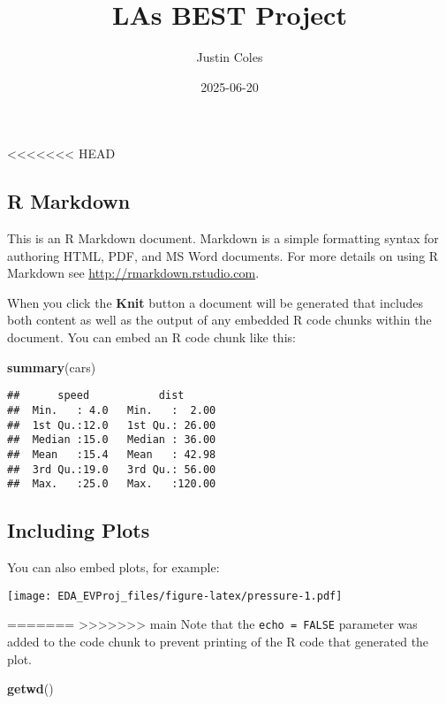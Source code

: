\documentclass[
]{article}
\title{LAs BEST Project}
\author{Justin Coles}
\date{2025-06-20}
\newenvironment{Shaded}{\begin{snugshade}}{\end{snugshade}}
\newcommand{\FunctionTok}[1]{\textcolor[rgb]{0.13,0.29,0.53}{\textbf{#1}}}
\newcommand{\NormalTok}[1]{#1}
\begin{document}
\maketitle

<<<<<<< HEAD
\subsection{R Markdown}\label{r-markdown}

This is an R Markdown document. Markdown is a simple formatting syntax
for authoring HTML, PDF, and MS Word documents. For more details on
using R Markdown see \url{http://rmarkdown.rstudio.com}.

When you click the \textbf{Knit} button a document will be generated
that includes both content as well as the output of any embedded R code
chunks within the document. You can embed an R code chunk like this:

\begin{Shaded}
\begin{Highlighting}[]
\FunctionTok{summary}\NormalTok{(cars)}
\end{Highlighting}
\end{Shaded}

\begin{verbatim}
##      speed           dist       
##  Min.   : 4.0   Min.   :  2.00  
##  1st Qu.:12.0   1st Qu.: 26.00  
##  Median :15.0   Median : 36.00  
##  Mean   :15.4   Mean   : 42.98  
##  3rd Qu.:19.0   3rd Qu.: 56.00  
##  Max.   :25.0   Max.   :120.00
\end{verbatim}

\subsection{Including Plots}\label{including-plots}

You can also embed plots, for example:

\texttt{[image: EDA\_EVProj\_files/figure-latex/pressure-1.pdf]}

=======
>>>>>>> main
Note that the \texttt{echo\ =\ FALSE} parameter was added to the code
chunk to prevent printing of the R code that generated the plot.

\begin{Shaded}
\begin{Highlighting}[]
\FunctionTok{getwd}\NormalTok{()}
\end{Highlighting}
\end{Shaded}
\end{document}
